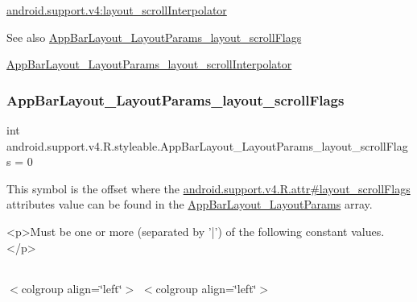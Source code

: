 {\ttfamily \hyperlink{classandroid_1_1support_1_1v4_1_1R_1_1styleable_a97ee4a175966cfa75d14a9d739d0b0fd}{android.\+support.\+v4\+:layout\+\_\+scroll\+Interpolator}}

\begin{DoxySeeAlso}{See also}
\hyperlink{classandroid_1_1support_1_1v4_1_1R_1_1styleable_a23c156548a9ddc6f6a61cd5d84570527}{App\+Bar\+Layout\+\_\+\+Layout\+Params\+\_\+layout\+\_\+scroll\+Flags} 

\hyperlink{classandroid_1_1support_1_1v4_1_1R_1_1styleable_a97ee4a175966cfa75d14a9d739d0b0fd}{App\+Bar\+Layout\+\_\+\+Layout\+Params\+\_\+layout\+\_\+scroll\+Interpolator} 
\end{DoxySeeAlso}
\mbox{\label{classandroid_1_1support_1_1v4_1_1R_1_1styleable_a23c156548a9ddc6f6a61cd5d84570527}} 
\subsubsection{\texorpdfstring{App\+Bar\+Layout\+\_\+\+Layout\+Params\+\_\+layout\+\_\+scroll\+Flags}{AppBarLayout\_LayoutParams\_layout\_scrollFlags}}
{\footnotesize\ttfamily int android.\+support.\+v4.\+R.\+styleable.\+App\+Bar\+Layout\+\_\+\+Layout\+Params\+\_\+layout\+\_\+scroll\+Flags = 0\hspace{0.3cm}{\ttfamily [static]}}

This symbol is the offset where the \hyperlink{classandroid_1_1support_1_1v4_1_1R_1_1attr_afe433c5f79342959f5c95f8fa7335ec2}{android.\+support.\+v4.\+R.\+attr\#layout\+\_\+scroll\+Flags} attribute\textquotesingle{}s value can be found in the \hyperlink{classandroid_1_1support_1_1v4_1_1R_1_1styleable_a08b2a4151f7d2667720f413dc2243694}{App\+Bar\+Layout\+\_\+\+Layout\+Params} array.

\begin{DoxyVerb}      <p>Must be one or more (separated by '|') of the following constant values.</p>
\end{DoxyVerb}
 \tabulinesep=1mm
\begin{longtabu} spread 0pt [c]{*{0}{|X[-1]}|}
\hline
\end{longtabu}
$<$colgroup align=\char`\"{}left\char`\"{}$>$ $<$colgroup align=\char`\"{}left\char`\"{}$>$ 

